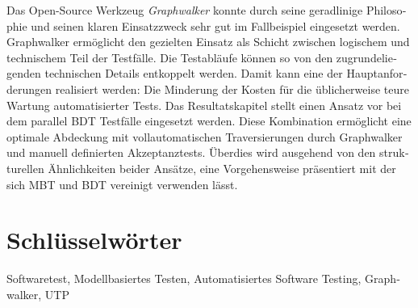\begin{otherlanguage}{ngerman}
Das Open-Source Werkzeug \textit{Graphwalker} konnte durch seine geradlinige Philosophie und seinen klaren Einsatzzweck sehr gut im Fallbeispiel eingesetzt werden. Graphwalker ermöglicht den gezielten Einsatz als Schicht zwischen logischem und technischem Teil der Testfälle. Die Testabläufe können so von den zugrundeliegenden technischen Details entkoppelt werden. Damit kann eine der Hauptanforderungen realisiert werden: Die Minderung der Kosten für die üblicherweise teure Wartung automatisierter Tests. Das Resultatskapitel stellt einen Ansatz vor bei dem parallel \Gls{BDT} Testfälle eingesetzt werden. Diese Kombination ermöglicht eine optimale Abdeckung mit vollautomatischen Traversierungen durch Graphwalker und manuell definierten Akzeptanztests. Überdies wird ausgehend von den strukturellen Ähnlichkeiten beider Ansätze, eine Vorgehensweise präsentiert mit der sich \Gls{MBT} und \Gls{BDT} vereinigt verwenden lässt.

\bigskip

  \section*{Schlüsselwörter}
  Softwaretest, Modellbasiertes Testen, Automatisiertes Software Testing, Graphwalker, UTP

\end{otherlanguage}


